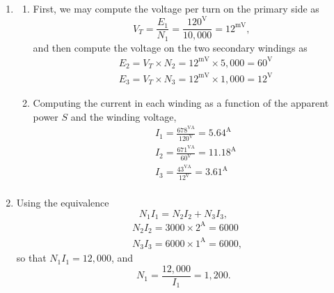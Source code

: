 \documentclass{article}
\begin{document}
\begin{enumerate}[label=\thesubsection]
\begin{enumerate}[label=\alph*)]
				\item Finding line current as a function of power on the load side, 
					\[
						I = \frac{12^{\mathrm{MVA}}}{(120 \times \sqrt{3})^{\mathrm{kV}}} = 57.74^{\mathrm{A}}. 
					\]
			\end{enumerate}
			\setcounter{subsection}{11}
			\item
			\begin{enumerate}[label=\alph*)]
				\item First, we may compute the voltage per turn on the primary side as
					\[
						V_{T} = \frac{E_1}{N_1} = \frac{120^{\mathrm{V}}}{10,000} = 12^{\mathrm{mV}},
					\]
					and then compute the voltage on the two secondary windings as 
					\begin{align*}
						&E_2 = V_T \times N_2 = 12^{\mathrm{mV}} \times 5,000 = 60^{\mathrm{V}} \\
						&E_3 = V_T \times N_3 = 12^{\mathrm{mV}} \times 1,000 = 12^{\mathrm{V}}
					\end{align*}
				\item Computing the current in each winding as a function of the apparent power \(S\) and the winding voltage, 
					\begin{align*}
						&I_1 = \frac{678^{\mathrm{VA}}}{120^{\mathrm{V}}} = 5.64^{\mathrm{A}}\\
						&I_2 = \frac{671^{\mathrm{VA}}}{60^{\mathrm{V}}} = 11.18^{\mathrm{A}}\\
						&I_3 = \frac{43^{\mathrm{VA}}}{12^{\mathrm{V}}} = 3.61^{\mathrm{A}}\\
					\end{align*}
			\end{enumerate}
			\setcounter{subsection}{12}
		\item Using the equivalence
			\[
			  N_1 I_1 = N_2 I_2 + N_3 I_3,
			\]
			\begin{align*}
			  &N_2 I_2 = 3000 \times 2^{\mathrm{A}} = 6000 \\
				&N_3 I_3 = 6000 \times 1^{\mathrm{A}} = 6000,
			\end{align*}
			so that \(N_1 I_1 = 12,000\), and
			\[
			  N_1 = \frac{12,000}{I_1} = 1,200.
			\]
\end{enumerate}
\end{document}
